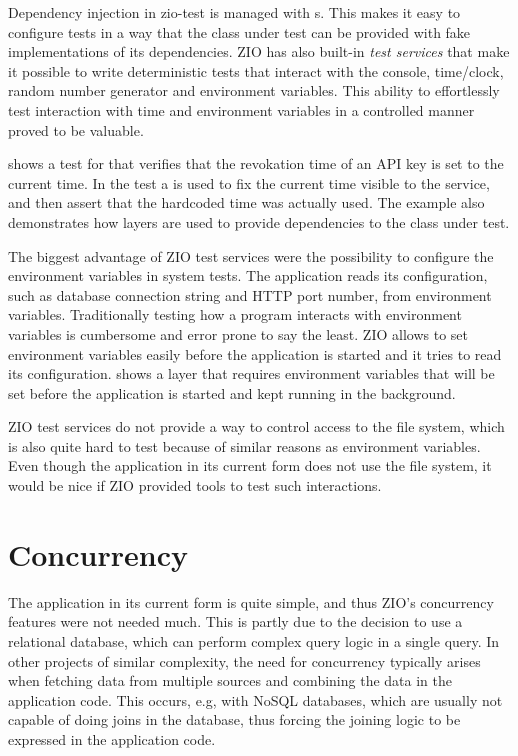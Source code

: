 Dependency injection in zio-test is managed with s. This makes it easy to configure tests in a way that the class under test can be provided with fake implementations of its dependencies. ZIO has also built-in \emph{test services} that make it possible to write deterministic tests that interact with the console, time/clock, random number generator and environment variables. This ability to effortlessly test interaction with time and environment variables in a controlled manner proved to be valuable.

 shows a test for  that verifies that the revokation time of an API key is set to the current time. In the test a  is used to fix the current time visible to the service, and then assert that the hardcoded time was actually used. The example also demonstrates how layers are used to provide dependencies to the class under test.



The biggest advantage of ZIO test services were the possibility to configure the environment variables in system tests. The application reads its configuration, such as database connection string and HTTP port number, from environment variables. Traditionally testing how a program interacts with environment variables is cumbersome and error prone to say the least. ZIO  allows to set environment variables easily before the application is started and it tries to read its configuration.  shows a layer that requires environment variables that will be set before the application is started and kept running in the background.



ZIO test services do not provide a way to control access to the file system, which is also quite hard to test because of similar reasons as environment variables. Even though the application in its current form does not use the file system, it would be nice if ZIO provided tools to test such interactions.


\section{Concurrency}
The application in its current form is quite simple, and thus ZIO's concurrency features were not needed much. This is partly due to the decision to use a relational database, which can perform complex query logic in a single query. In other projects of similar complexity, the need for concurrency typically arises when fetching data from multiple sources and combining the data in the application code. This occurs, e.g, with NoSQL databases, which are usually not capable of doing joins in the database, thus forcing the joining logic to be expressed in the application code.

